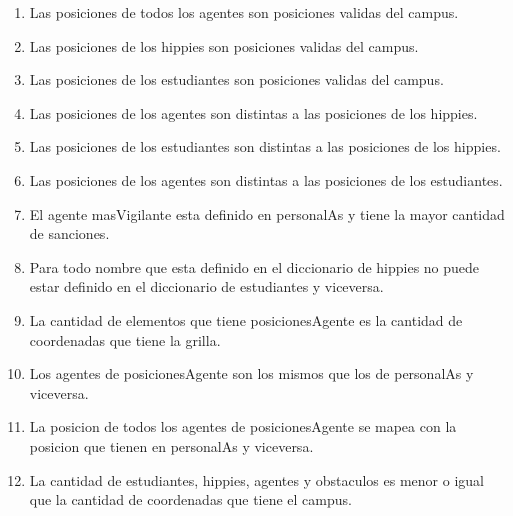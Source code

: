 \begin{enumerate}
	\item Las posiciones de todos los agentes son posiciones validas del campus.
	\item Las posiciones de los hippies son posiciones validas del campus.
	\item Las posiciones de los estudiantes son posiciones validas del campus.
	\item Las posiciones de los agentes son distintas a las posiciones de los hippies.
	\item Las posiciones de los estudiantes son distintas a las posiciones de los hippies.
	\item Las posiciones de los agentes son distintas a las posiciones de los estudiantes.
	\item El agente masVigilante esta definido en personalAs y tiene la mayor cantidad de sanciones.
	\item Para todo nombre que esta definido en el diccionario de hippies no puede estar definido en el diccionario de estudiantes y viceversa.
	\item La cantidad de elementos que tiene posicionesAgente es la cantidad de coordenadas que tiene la grilla.
	
	\item Los agentes de posicionesAgente son los mismos que los de personalAs y viceversa.
	\item La posicion de todos los agentes de posicionesAgente se mapea con la posicion que tienen en personalAs y viceversa.
	\item La cantidad de estudiantes, hippies, agentes y obstaculos es menor o igual que la cantidad de coordenadas que tiene el campus.

\end{enumerate}

\pagebreak

